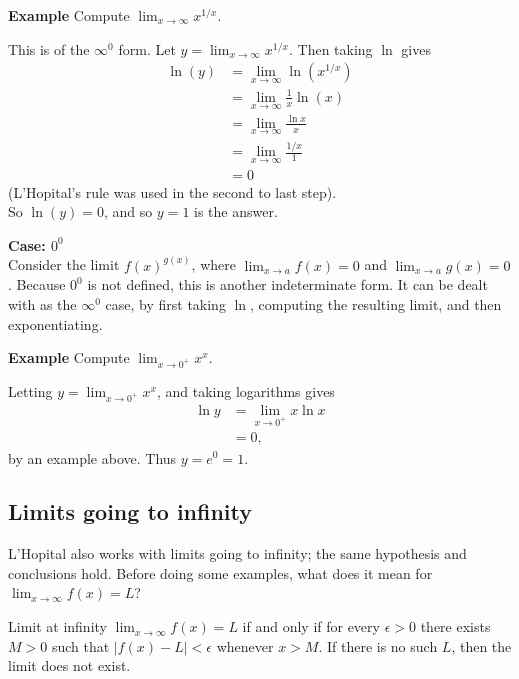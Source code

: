 \documentclass[a4paper]{book}
\begin{document}
\begin{sloppypar}
\textbf{Example} Compute $\displaystyle \lim_{x \rightarrow \infty} x^{1/x}$. 
\begin{examplebox}
This is of the $\infty^0$ form. Let $\displaystyle y = \lim_{x \rightarrow \infty} x^{1/x}$. Then taking $\ln$ gives
\begin{align*}
\ln(y) &= \lim_{x \rightarrow \infty} \ln\left(x^{1/x}\right) \\
&= \lim_{x \rightarrow \infty} \frac{1}{x}\ln(x) \\
&= \lim_{x \rightarrow \infty} \frac{\ln x}{x} \\
&= \lim_{x \rightarrow \infty} \frac{1/x}{1} \\
&= 0 
\end{align*}
(L'Hopital's rule was used in the second to last step).\\
So $\ln(y) = 0$, and so $y = 1$ is the answer.
\end{examplebox}
\bigbreak
\noindent \textbf{Case: $0^0$}\\

Consider the limit $\displaystyle f(x)^{g\left(x\right)}$, where $\displaystyle \lim_{x \rightarrow a} f(x) = 0$ and $\displaystyle \lim_{x \rightarrow a} g(x) = 0$. Because $0^0$ is not defined, this is another indeterminate form. It can be dealt with as the $\infty^0$ case, by first taking $\ln$, computing the resulting limit, and then exponentiating.

\textbf{Example} Compute $\displaystyle \lim_{x \rightarrow 0^+} x^x$. 
\begin{examplebox}
Letting $\displaystyle y = \lim_{x \rightarrow 0^+} x^x$, and taking logarithms gives
\begin{align*}
\ln y &= \lim_{x \rightarrow 0^+} x \ln x \\
&= 0, 
\end{align*}
by an example above. Thus $y = e^0 = 1$.
\end{examplebox}

\subsection{Limits going to infinity}
L'Hopital also works with limits going to infinity; the same hypothesis and conclusions hold. Before doing some examples, what does it mean for $\displaystyle \lim_{x \rightarrow \infty} f(x) = L$?
\begin{definitionbox}
Limit at infinity $\displaystyle \lim_{x \rightarrow \infty} f(x) = L$ if and only if for every $\epsilon>0$ there exists $M>0$ such that $|f(x)-L|<\epsilon$ whenever $x>M$. If there is no such $L$, then the limit does not exist.
\end{definitionbox}


\end{sloppypar}
\end{document}
